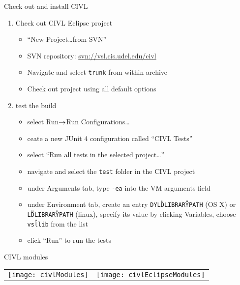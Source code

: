 \documentclass[t]{beamer}
\begin{document}
\begin{frame}{Check out and install CIVL}
  \begin{enumerate}
  \item Check out CIVL Eclipse project 
    \begin{itemize}
    \item ``New Project\ldots from SVN''
    \item SVN repository: \url{svn://vsl.cis.udel.edu/civl}
    \item Navigate and select \texttt{trunk} from within archive
    \item Check out project using all default options
    \end{itemize}
  \item test the build
    \begin{itemize}
    \item select Run$\rightarrow$Run Configurations\ldots
    \item ceate a new JUnit 4 configuration called ``CIVL Tests''
    \item select ``Run all tests in the selected project\ldots''
    \item navigate and select the \texttt{test} folder in the CIVL project
    \item under Arguments tab, type \texttt{-ea} into the VM arguments field
    \item under Environment tab, create an entry
      \texttt{DYLD{\U}LIBRARY{\U}PATH} (OS X) or
      \texttt{LD{\U}LIBRARY{\U}PATH} (linux), specify its value by
      clicking Variables, choose \texttt{vsl{\U}lib} from the list
    \item click ``Run'' to run the tests
    \end{itemize}
  \end{enumerate}
\end{frame}

\begin{frame}{CIVL modules}
  \begin{tabular}{@{}ll@{}}
    \texttt{[image: civlModules]}
    &
    \texttt{[image: civlEclipseModules]}
  \end{tabular}
\end{frame}
\end{document}
